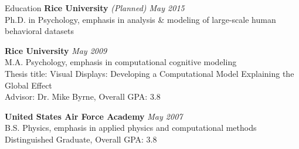  
\begin{rSection}{Education}
  {\bf Rice University} \hfill {\em (Planned) May 2015} \\
  Ph.D. in Psychology, emphasis in analysis \& modeling of large-scale human behavioral datasets
\item {\bf Rice University} \hfill {\em May 2009} \\ 
  M.A. Psychology, emphasis in computational cognitive modeling \\
  Thesis title: Visual Displays: Developing a Computational Model Explaining the Global Effect \\
  Advisor: Dr. Mike Byrne, Overall GPA: 3.8
\item {\bf United States Air Force Academy} \hfill {\em May 2007} \\ 
  B.S. Physics, emphasis in applied physics and computational methods \\
  Distinguished Graduate, Overall GPA: 3.8 
\end{rSection}

